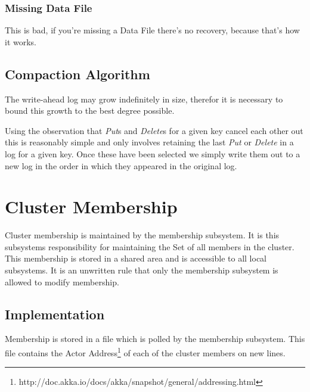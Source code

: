 \documentclass[11pt]{article}
\begin{document}
\subsubsection{Missing Data File}
This is bad, if you're missing a Data File there's no recovery, because that's how it works.

\subsection{Compaction Algorithm}
The write-ahead log may grow indefinitely in size, therefor it is necessary to bound this
growth to the best degree possible.

Using the observation that {\em Put}s and {\em Delete}s for a given key cancel each
other out this is reasonably simple and only involves retaining the last {\em Put}
or {\em Delete} in a log for a given key. Once these have been selected we simply
write them out to a new log in the order in which they appeared in the original
log.

\section{Cluster Membership}
Cluster membership is maintained by the membership subsystem.  It is this subsystems responsibility for maintaining the Set of all members in the cluster.  This membership is stored in a shared area and is accessible to all local subsystems.  It is an unwritten rule that only the membership subsystem is allowed to modify membership.

\subsection{Implementation}
Membership is stored in a file which is polled by the membership subsystem. This file contains the Actor Address\footnote{http://doc.akka.io/docs/akka/snapshot/general/addressing.html} of each of the cluster members on new lines.
\end{document}
